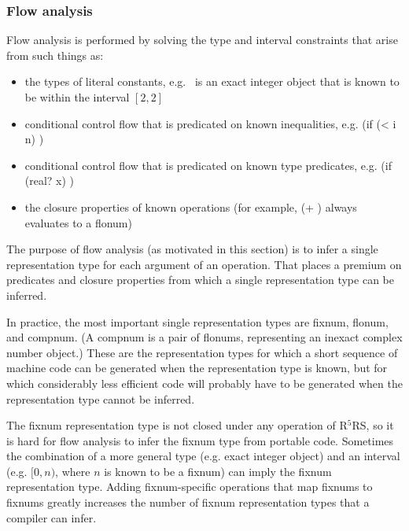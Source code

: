 \documentclass[twoside,twocolumn]{algol60}
\newcommand{\rn}[1]{R$^{#1}$RS}
\begin{document}
\subsubsection{Flow analysis}

Flow analysis is performed by solving the type and interval
constraints that arise from such things as:

\begin{itemize}
\item the types of literal constants, e.g.\ {} is an exact
  integer object
  that is known to be within the interval $[2,2]$
  
\item conditional control flow that is predicated on known
  inequalities, e.g. {\cf (if (< i n)  )}
  
\item conditional control flow that is predicated on known type
  predicates, e.g. {\cf (if (real? x)  )}
  
\item the closure properties of known operations (for example, {\cf (+
     )} always evaluates to a flonum)
\end{itemize}
  
The purpose of flow analysis (as motivated in this section) is to infer a
single representation type for each argument of an operation.  That
places a premium on predicates and closure properties from which a
single representation type can be inferred.

In practice, the most important single representation types are
fixnum, flonum, and compnum.  (A compnum is a pair of flonums,
representing an inexact complex number object.)  These are the representation
types for which a short sequence of machine code can be generated when
the representation type is known, but for which considerably less
efficient code will probably have to be generated when the
representation type cannot be inferred.

The fixnum representation type is not closed under any operation of
\rn{5}, so it is hard for flow analysis to infer the fixnum type from
portable code.  Sometimes the combination of a more general type (e.g.
exact integer object) and an interval (e.g.  $[0,n)$, where $n$ is known to
be a fixnum) can imply the fixnum representation type.  Adding
fixnum-specific operations that map fixnums to fixnums 
greatly increases the number of fixnum
representation types that a compiler can infer.
\end{document}
